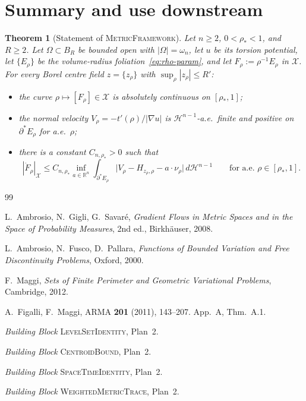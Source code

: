 \documentclass[11pt]{article}
\newtheorem{theorem}{Theorem}[section]
\theoremstyle{definition}
\newcommand{\R}{\mathbb{R}}
\newcommand{\Om}{\Omega}
\newcommand{\rstar}{\rho_{*}}
\newcommand{\X}{\mathcal X}
\begin{document}
\section{Summary and use downstream}\label{sec:summary}

\begin{theorem}[Statement of \textsc{MetricFramework}]\label{thm:main}
Let $n\ge 2$, $0<\rstar<1$, and $R\ge 2$. Let $\Om\subset B_R$ be bounded
open with $|\Om|=\omega_n$, let $u$ be its torsion potential, let $\{E_\rho\}$
be the volume-radius foliation~\eqref{eq:rho-param}, and let
$F_\rho:=\rho^{-1}E_\rho$ in $\X$. For every Borel centre field $z=\{z_\rho\}$
with $\sup_\rho|z_\rho|\le R'$:
\begin{itemize}
\item the curve $\rho\mapsto[F_\rho]\in\X$ is absolutely continuous on
$[\rstar,1]$;
\item the normal velocity $V_\rho=-t'(\rho)/|\nabla u|$ is $\mathcal H^{n-1}$-a.e.\
finite and positive on $\partial^*E_\rho$ for a.e.\ $\rho$;
\item there is a constant $C_{n,\rstar}>0$ such that
\[
   |\dot F_\rho|_\X\le C_{n,\rstar}\inf_{a\in\R^n}
   \int_{\partial^*E_\rho}\bigl|V_\rho-H_{z_\rho,\rho}-a\cdot\nu_\rho\bigr|
   \,d\mathcal H^{n-1}\qquad\text{for a.e.\ }\rho\in[\rstar,1].
\]
\end{itemize}
\end{theorem}

\begin{thebibliography}{99}

L.~Ambrosio, N.~Gigli, G.~Savar\'e,
\emph{Gradient Flows in Metric Spaces and in the Space of Probability
Measures}, 2nd ed., Birkh\"auser, 2008.

L.~Ambrosio, N.~Fusco, D.~Pallara,
\emph{Functions of Bounded Variation and Free Discontinuity Problems},
Oxford, 2000.

F.~Maggi, \emph{Sets of Finite Perimeter and Geometric Variational
Problems}, Cambridge, 2012.

A.~Figalli, F.~Maggi, ARMA \textbf{201} (2011), 143--207. App.~A, Thm.~A.1.

\emph{Building Block} \textsc{LevelSetIdentity}, Plan~2.

\emph{Building Block} \textsc{CentroidBound}, Plan~2.

\emph{Building Block} \textsc{SpaceTimeIdentity}, Plan~2.

\emph{Building Block} \textsc{WeightedMetricTrace}, Plan~2.

\end{thebibliography}
\end{document}
